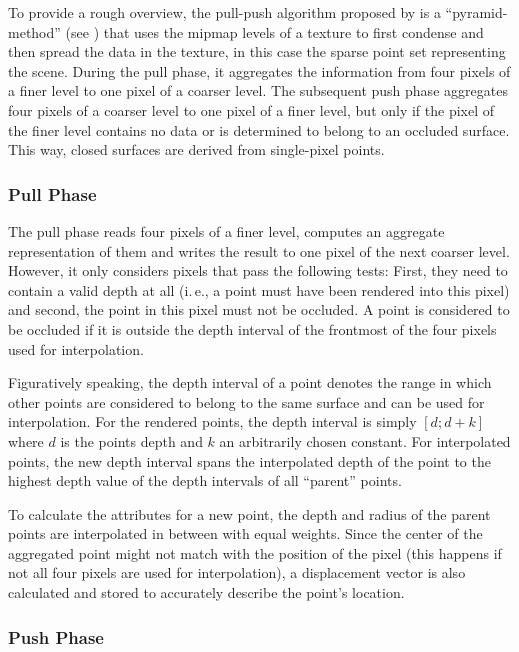 To provide a rough overview, the pull-push algorithm proposed by \cite{Marroquim:2007:reconstruction} is a ``pyramid-method'' (see \cite{Strengert:2006:Pyramid}) that uses the mipmap levels of a texture to first condense and then spread the data in the texture, in this case the sparse point set representing the scene. During the pull phase, it aggregates the information from four pixels of a finer level to one pixel of a coarser level. The subsequent push phase aggregates four pixels of a coarser level to one pixel of a finer level, but only if the pixel of the finer level contains no data or is determined to belong to an occluded surface. This way, closed surfaces are derived from single-pixel points.

\subsubsection{Pull Phase}
The pull phase reads four pixels of a finer level, computes an aggregate representation of them and writes the result to one pixel of the next coarser level. However, it only considers pixels that pass the following tests: First, they need to contain a valid depth at all (i.\,e., a point must have been rendered into this pixel) and second, the point in this pixel must not be occluded. A point is considered to be occluded if it is outside  the depth interval of the frontmost of the four pixels used for interpolation.

Figuratively speaking, the depth interval of a point denotes the range in which other points are considered to belong to the same surface and can be used for interpolation. For the rendered points, the depth interval is simply $[d;d+k]$ where $d$ is the points depth and $k$ an arbitrarily chosen constant. For interpolated points, the new depth interval spans the interpolated depth of the point to the highest depth value of the depth intervals of all ``parent'' points.

To calculate the attributes for a new point, the depth and radius of the parent points are interpolated in between with equal weights. Since the center of the aggregated point might not match with the position of the pixel (this happens if not all four pixels are used for interpolation), a displacement vector is also calculated and stored to accurately describe the point's location.


\subsubsection{Push Phase}

